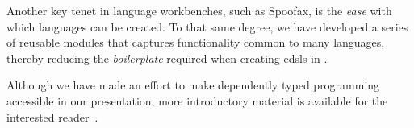 Another key tenet in language workbenches, such as Spoofax,
is the \emph{ease} with which languages can be created.
%
To that same degree, we have developed a series
of reusable modules
that captures
functionality common to many languages,
%
thereby reducing the \emph{boilerplate} required when creating \acp{edsl} in \Idris{}.

Although we have made an effort to make dependently typed
programming accessible in our presentation, more introductory
material is available for the interested reader~\cite{plfa22.08,brady17:_type_driven_devel_idris}.


